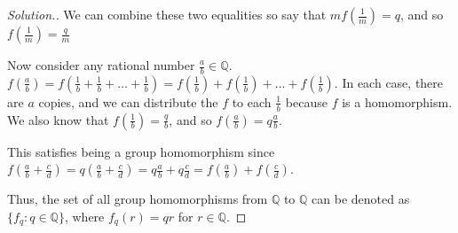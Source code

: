 \documentclass{article}
\newcommand{\sk}{\smallskip}
\newcommand{\Q}{\mathbb{Q}}
\begin{document}
\begin{enumerate}
\begin{enumerate}
\begin{proof}[Solution.]
            \sk

            We can combine these two equalities so say that $mf\left(\frac{1}{m}\right) = q$, and so $f\left(\frac{1}{m}\right) = \frac{q}{m}$

            \sk
            
            Now consider any rational number $\frac{a}{b} \in \Q$. $f\left(\frac{a}{b}\right) = f\left(\frac{1}{b} + \frac{1}{b} + \dots + \frac{1}{b}\right) = f\left(\frac{1}{b}\right) + f\left(\frac{1}{b}\right) + \dots + f\left(\frac{1}{b}\right)$. In each case, there are $a$ copies, and we can distribute the $f$ to each $\frac{1}{b}$ because $f$ is a homomorphism. We also know that $f\left(\frac{1}{b}\right) =\frac{q}{b}$, and so $f\left(\frac{a}{b}\right) = q\frac{a}{b}$. 

            \sk

            This satisfies being a group homomorphism since $f\left(\frac{a}{b} + \frac{c}{d}\right) = q\left(\frac{a}{b} + \frac{c}{d}\right) = q\frac{a}{b} + q\frac{c}{d} = f\left(\frac{a}{b}\right) + f\left(\frac{c}{d}\right)$.

            \sk 

            Thus, the set of all group homomorphisms from $\Q$ to $\Q$ can be denoted as $\{f_q : q \in \Q \}$, where $f_q(r) = qr$ for $r \in \Q$.
            \end{proof} 
    \end{enumerate}

    
\end{enumerate}
\end{document}
